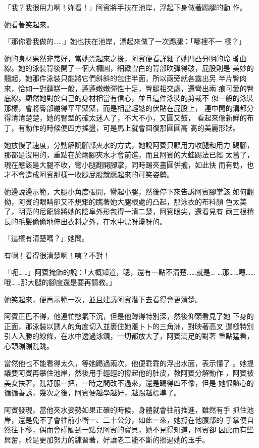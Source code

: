「我？我很用力啊！妳看！」阿賓將手扶在池岸，浮起下身做著踢腿的動
作。

她看著笑起來。

「那你看我做的……」她也扶在池岸，漂起來做了一次踢腿：「哪裡不一
樣？」

她的身材果然非常好，當她漂起來之後，阿賓便看詳細了她凹凸分明的玲
瓏曲線。她的泳裝背後開了一個大橢圓，細緻雪白的背部吹彈得破，屁股則是
美妙的翹起，她那件泳裝只能將它們斜斜的包住半面，所以兩旁就各露出另
半片臀肉來，恰如一對麵糕一般，蓬蓬嫩嫩彈性十足，臀腿相交處，還彎出兩
痕可愛的臀底線。顯然她對於自己的身材相當有信心，並且這件泳裝的剪裁不
似一般的泳裝那樣，會將臀部繃得平平緊緊，而是相當輕鬆的伏貼在屁股上，
連中間的溝都分得清清楚楚，她的臀型的確太迷人了，不大不小，又圓又鼓，
看起來像新鮮的布丁，有動作的時候便四方搖盪，可是馬上就會回復那圓圓高
高的美麗形狀。

她放慢了速度，分動解說腳部夾水的方式，她說阿賓只顧用力收腿和用力
踢腳，那都是沒用的，重點在於兩腳夾水才會前進，而且阿賓的大蛙踢法已經
太舊了，現在應該是大腿不收，彎小腿翻開腳掌，同時踢夾畫圓併攏，如此快
而有勁，也才不會造成阿賓那樣一收腿屁股就蹶起來的可笑姿勢。

她邊說邊示範，大腿小角度張開，彎起小腿，然後停下來告訴阿賓腳掌該
如何翻拗，阿賓的眼睛卻又不規矩的瞧著她大腿根處的凸起，那泳衣的布料顏
色太美了，明亮的尼龍絲將她的陰阜外形包得一清二楚，阿賓眼尖，還看見有
兩三根稍長的毛髮偷偷地伸出衣料之外，在水中漂呀盪呀的。

「這樣有清楚嗎？」她問。

有啊！看得很清楚啊！咦？不對！

「呃……」阿賓掩飾的說：「大概知道，嗯，還有一點不清楚……就是…
…那……嗯……哦……那大腿的腳度還是要再請教。」

她笑起來，便再示範一次，並且建議阿賓潛下去看得會更清楚。

阿賓正巴不得，他連忙憋氣下沉，但是他蹲得特別深，然後仰頭看見了她
下身的正面，那泳裝以誘人的角度切入並裹住她漲卜卜的三角洲，對映著高叉
邊縫特別引人入勝的線條，在水中透過泳鏡，一切都放大了，阿賓滿足的對著
重點猛看，心頭蹦蹦亂跳。

當然他也不能看得太久，等她踢過兩次，他便乖乖的浮出水面，表示懂了
。她提議要阿賓再攀住池岸，然後用手輕輕的撐起他的肚皮，教阿賓分解動作
，阿賓被美女扶著，亂舒服一把，一時之間改不過來，還是踢得四不像，但是
她很熱心的循循善誘，幾次之後，阿賓便越學越好，越踢越標準了。

阿賓發現，當他夾水姿勢如果正確的時候，身體就會往前推進，雖然有手
抓住池岸，還是免不了會往前小衝一、二十公分，如此一來，她撐在他腹部的
手掌便自然往下移，偶而會碰觸到一點兒阿賓的寶貝，她不見得知道，阿賓卻
因此而有些興奮，於是更加努力的練習著，好讓老二能不斷的擦過她的玉手。

